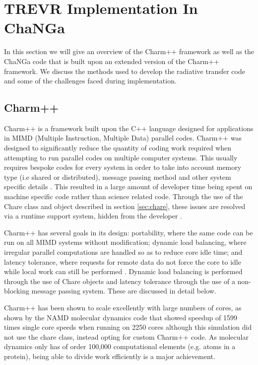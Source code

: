 \chapter{TREVR Implementation In ChaNGa}
\label{sec:ChaNGa}
In this section we will give an overview of the Charm++ framework as well as the ChaNGa code that is built upon an extended version of the Charm++ framework. We discuss the methods used to develop the radiative transfer code and some of the challenges faced during implementation.

\section{Charm++}
Charm++ is a framework built upon the C++ language designed for applications in MIMD (Multiple Instruction, Multiple Data) parallel codes. Charm++ was designed to significantly reduce the quantity of coding work required when attempting to run parallel codes on multiple computer systems. This usually requires bespoke codes for every system in order to take into account memory type (i.e shared or distributed), message passing method and other system specific details \citep{Charm1}. This resulted in a large amount of developer time being spent on machine specific code rather than science related code. Through the use of the Chare class and object described in section \ref{sec:chare}, these issues are resolved via a runtime support system, hidden from the developer \citep{Charm2}.

Charm++ has several goals in its design: portability, where the same code can be run on all MIMD systems without modification; dynamic load balancing, where irregular parallel computations are handled so as to reduce core idle time; and latency tolerance, where requests for remote data do not force the core to idle while local work can still be performed \citep{Charm1}. Dynamic load balancing is performed through the use of Chare objects and latency tolerance through the use of a non-blocking message passing system. These are discussed in detail below.

Charm++ has been shown to scale excellently with large numbers of cores, as shown by the NAMD molecular dynamics code that showed speedup of 1599 times single core speeds when running on 2250 cores \citep{NAMD} although this simulation did not use the chare class, instead opting for custom Charm++ code. As molecular dynamics only has of order 100,000 computational elements (e.g. atoms in a protein), being able to divide work efficiently is a major achievement.


